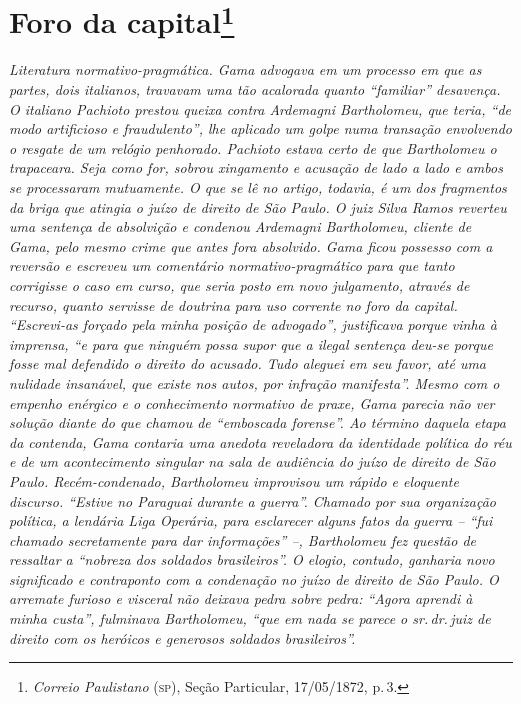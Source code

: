 \chapter{Foro da capital\footnote{\emph{Correio Paulistano} (\textsc{sp}), Seção Particular,
  17/05/1872, p.\,3.}} %

\begin{didascalia}
\emph{Literatura normativo-pragmática. Gama advogava em um processo em
que as partes, dois italianos, travavam uma tão acalorada quanto
``familiar'' desavença. O italiano Pachioto prestou queixa contra
Ardemagni Bartholomeu, que teria, ``de modo artificioso e fraudulento'',
lhe aplicado um golpe numa transação envolvendo o resgate de um relógio
penhorado. Pachioto estava certo de que Bartholomeu o trapaceara. Seja
como for, sobrou xingamento e acusação de lado a lado e ambos se
processaram mutuamente. O que se lê no artigo, todavia, é um dos
fragmentos da briga que atingia o juízo de direito de São Paulo. O juiz
Silva Ramos reverteu uma sentença de absolvição e condenou Ardemagni
Bartholomeu, cliente de Gama, pelo mesmo crime que antes fora absolvido.
Gama ficou possesso com a reversão e escreveu um comentário
normativo-pragmático para que tanto corrigisse o caso em curso, que
seria posto em novo julgamento, através de recurso, quanto servisse de
doutrina para uso corrente no foro da capital. ``Escrevi-as forçado pela
minha posição de advogado'', justificava porque vinha à imprensa, ``e para
que ninguém possa supor que a ilegal sentença deu-se porque fosse mal
defendido o direito do acusado. Tudo aleguei em seu favor, até uma
nulidade insanável, que existe nos autos, por infração manifesta''. Mesmo
com o empenho enérgico e o conhecimento normativo de praxe, Gama parecia
não ver solução diante do que chamou de ``emboscada forense''. Ao término
daquela etapa da contenda, Gama contaria uma anedota reveladora da
identidade política do réu e de um acontecimento singular na sala de
audiência do juízo de direito de São Paulo. Recém-condenado, Bartholomeu
improvisou um rápido e eloquente discurso. ``Estive no Paraguai durante a
guerra''. Chamado por sua organização política, a lendária Liga Operária,
para esclarecer alguns fatos da guerra -- ``fui chamado secretamente para
dar informações'' --, Bartholomeu fez questão de ressaltar a ``nobreza dos
soldados brasileiros''. O elogio, contudo, ganharia novo significado e
contraponto com a condenação no juízo de direito de São Paulo. O
arremate furioso e visceral não deixava pedra sobre pedra: ``Agora
aprendi à minha custa'', fulminava Bartholomeu, ``que em nada se parece o
sr.\,dr.\,juiz de direito com os heróicos e generosos soldados
brasileiros''.}
\end{didascalia}

